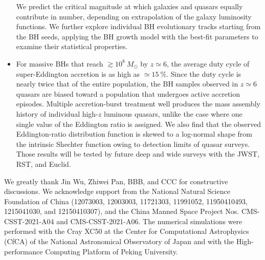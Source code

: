 \documentclass[twocolumn, twocolappendix]{aastex63}
\newcommand{\Msun}{M_\odot}
\begin{document}
\begin{CJK*}{UTF8}{gbsn}
\begin{itemize}
We predict the critical magnitude at which galaxies and quasars equally contribute in number,
depending on extrapolation of the galaxy luminosity functions.
We further explore individual BH evolutionary tracks starting from the BH seeds, applying the BH growth model
with the best-fit parameters to examine their statistical properties.
\item
For massive BHs that reach $\gtrsim 10^8~\Msun$ by $z\simeq 6$, the average duty cycle of super-Eddington accretion is as high as $\simeq 15~\%$.
Since the duty cycle is nearly twice that of the entire population, the BH samples observed in $z\simeq 6$ quasars are
biased toward a population that undergoes active accretion episodes.
Multiple accretion-burst treatment well produces the mass assembly history of individual high-$z$ luminous quasars,
unlike the case where one single value of the Eddington ratio is assigned.
We also find that the observed Eddington-ratio distribution function is skewed to a log-normal shape from the intrinsic Shechter function
owing to detection limits of quasar surveys.
Those results will be tested by future deep and wide surveys with the JWST, RST, and Euclid.
\end{itemize}

\acknowledgments
We greatly thank Jin Wu, Zhiwei Pan, BBB, and CCC for constructive discussions. 
We acknowledge support from the National Natural Science Foundation of China 
(12073003, 12003003, 11721303, 11991052, 11950410493, 1215041030, and 12150410307), 
and the China Manned Space Project Nos. CMS-CSST-2021-A04 and CMS-CSST-2021-A06. 
The numerical simulations were performed with the Cray XC50 at the Center for Computational Astrophysics (CfCA) 
of the National Astronomical Observatory of Japan and with the High-performance Computing Platform of Peking University.
%





\end{CJK*}
\end{document}
